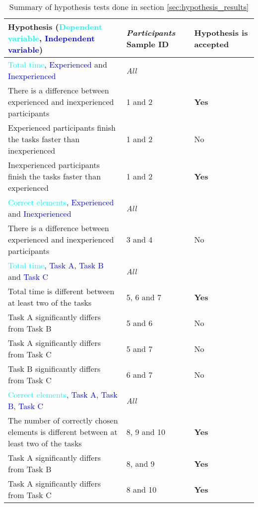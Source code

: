 	\begin{longtable}{p{}|p{}|p{}}  %
	\caption[Summary, hypothesis tests]{Summary of hypothesis tests done in section \ref{sec:hypothesis_results}} \label{tab:hypothesistest_summary} \\
		Hypothesis (\textcolor{cyan}{Dependent variable}, \textcolor{blue}{Independent variable}) & \textit{Participants} Sample ID& Hypothesis is accepted \\[0.2cm] \hline
		\textcolor{cyan}{Total time}, \textcolor{blue}{Experienced} and \textcolor{blue}{Inexperienced} & \textit{All} &  \\
		There is a difference between experienced and inexperienced participants & 1 and 2 & \textbf{Yes} \\
		Experienced participants finish the tasks faster than inexperienced  & 1 and 2 & No   \\ 
		Inexperienced participants finish the tasks faster than experienced  & 1 and 2 & \textbf{Yes}   \\ \hline
		\textcolor{cyan}{Correct elements}, \textcolor{blue}{Experienced} and \textcolor{blue}{Inexperienced} & \textit{All} &  \\
		There is a difference between experienced and inexperienced participants & 3 and 4 & No   \\ \hline
		\textcolor{cyan}{Total time}, \textcolor{blue}{Task A}, \textcolor{blue}{Task B} and \textcolor{blue}{Task C}& \textit{All} &  \\
		 Total time is different between at least two of the tasks & 5, 6 and 7 & \textbf{Yes}   \\
		 Task A significantly differs from Task B & 5 and 6 & No  \\ 
		 Task A significantly differs from Task C & 5 and 7 & No  \\ 
		 Task B significantly differs from Task C & 6 and 7 & No  \\ \hline
		\textcolor{cyan}{Correct elements}, \textcolor{blue}{Task A}, \textcolor{blue}{Task B}, \textcolor{blue}{Task C} & \textit{All} &  \\
		The number of correctly chosen elements is different between at least two of the tasks & 8, 9 and 10 & \textbf{Yes}  \\
		Task A significantly differs from Task B & 8, and 9 & \textbf{Yes}  \\ 
		Task A significantly differs from Task C & 8 and 10 & \textbf{Yes}  \\ 

\end{longtable}
